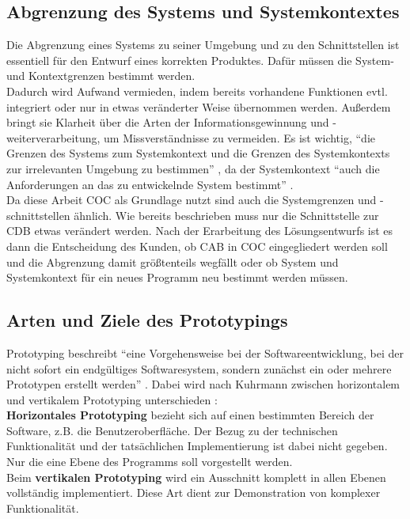 \documentclass [12pt, a4paper, oneside, titlepage, ngerman]{article}
\begin{document}
\subsection{Abgrenzung des Systems und Systemkontextes}
Die Abgrenzung eines Systems zu seiner Umgebung und zu den Schnittstellen ist essentiell für den Entwurf eines korrekten Produktes. Dafür müssen die System- und Kontextgrenzen bestimmt werden. \\
Dadurch wird Aufwand vermieden, indem bereits vorhandene Funktionen evtl. integriert oder nur in etwas veränderter Weise übernommen werden. Außerdem bringt sie Klarheit über die Arten der Informationsgewinnung und -weiterverarbeitung, um Missverständnisse zu vermeiden. Es ist wichtig, "`die Grenzen des Systems zum Systemkontext und die Grenzen des Systemkontexts zur irrelevanten Umgebung zu bestimmen"' \cite[S.20]{PohlRupp2015}, da der Systemkontext "`auch die Anforderungen an das zu entwickelnde System bestimmt"' \cite[S.20]{PohlRupp2015}. \\
Da diese Arbeit \ac{COC} als Grundlage nutzt sind auch die Systemgrenzen und -schnittstellen ähnlich. Wie bereits beschrieben muss nur die Schnittstelle zur \ac{CDB} etwas verändert werden. Nach der Erarbeitung des Lösungsentwurfs ist es dann die Entscheidung des Kunden, ob \ac{CAB} in \ac{COC} eingegliedert werden soll und die Abgrenzung damit größtenteils wegfällt oder ob System und Systemkontext für ein neues Programm neu bestimmt werden müssen.

\subsection{Arten und Ziele des Prototypings}
Prototyping beschreibt "`eine Vorgehensweise bei der Softwareentwicklung, bei der nicht sofort ein endgültiges Softwaresystem, sondern zunächst ein oder mehrere Prototypen erstellt werden"' \cite[S.152]{gabler}. Dabei wird nach Kuhrmann zwischen horizontalem und vertikalem Prototyping unterschieden \cite[vgl.][]{Kuhrmann2012}: \\ 
\textbf{Horizontales Prototyping} bezieht sich auf einen bestimmten Bereich der Software, z.B. die Benutzeroberfläche. Der Bezug zu der technischen Funktionalität und der tatsächlichen Implementierung ist dabei nicht gegeben. Nur die eine Ebene des Programms soll vorgestellt werden.\\
Beim \textbf{vertikalen Prototyping} wird ein Ausschnitt komplett in allen Ebenen vollständig implementiert. Diese Art dient zur Demonstration von komplexer Funktionalität.\\
\end{document}
